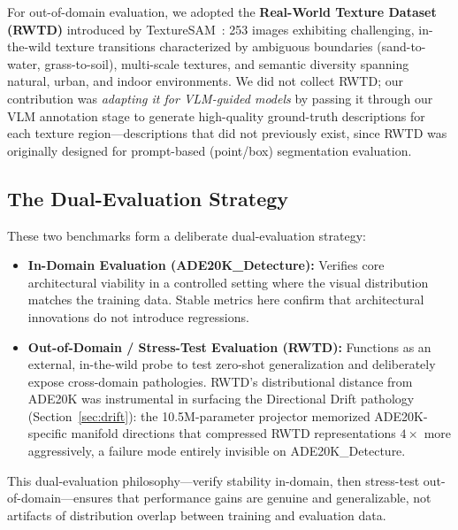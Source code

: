 \documentclass{article}
\begin{document}
For out-of-domain evaluation, we adopted the \textbf{Real-World Texture Dataset (RWTD)} introduced by TextureSAM~\cite{texturesam}: 253 images exhibiting challenging, in-the-wild texture transitions characterized by ambiguous boundaries (sand-to-water, grass-to-soil), multi-scale textures, and semantic diversity spanning natural, urban, and indoor environments. We did not collect RWTD; our contribution was \emph{adapting it for VLM-guided models} by passing it through our VLM annotation stage to generate high-quality ground-truth descriptions for each texture region---descriptions that did not previously exist, since RWTD was originally designed for prompt-based (point/box) segmentation evaluation.

\subsection{The Dual-Evaluation Strategy}
\label{sec:dual_eval}

These two benchmarks form a deliberate dual-evaluation strategy:

\begin{itemize}
    \item \textbf{In-Domain Evaluation (ADE20K\_Detecture):} Verifies core architectural viability in a controlled setting where the visual distribution matches the training data. Stable metrics here confirm that architectural innovations do not introduce regressions.

    \item \textbf{Out-of-Domain / Stress-Test Evaluation (RWTD):} Functions as an external, in-the-wild probe to test zero-shot generalization and deliberately expose cross-domain pathologies. RWTD's distributional distance from ADE20K was instrumental in surfacing the Directional Drift pathology (Section~\ref{sec:drift}): the 10.5M-parameter projector memorized ADE20K-specific manifold directions that compressed RWTD representations $4\times$ more aggressively, a failure mode entirely invisible on ADE20K\_Detecture.
\end{itemize}

This dual-evaluation philosophy---verify stability in-domain, then stress-test out-of-domain---ensures that performance gains are genuine and generalizable, not artifacts of distribution overlap between training and evaluation data.

\end{document}
